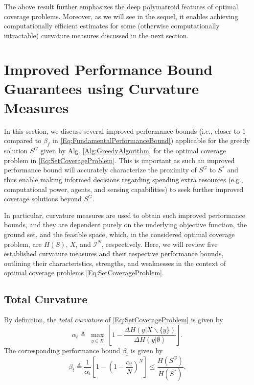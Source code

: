 \documentclass[letterpaper, 10 pt, conference]{ieeeconf}
\begin{document}


The above result further emphasizes the deep polymatroid features of optimal coverage problems. Moreover, as we will see in the sequel, it enables achieving computationally efficient estimates for some (otherwise computationally intractable) curvature measures discussed in the next section.


\section{Improved Performance Bound Guarantees using Curvature Measures}
\label{Sec:CurvatureMeasures}

In this section, we discuss several improved performance bounds (i.e., closer to $1$ compared to $\beta_f$ in \eqref{Eq:FundamentalPerformanceBound}) applicable for the greedy solution $S^G$ given by Alg. \ref{Alg:GreedyAlgorithm} for the optimal coverage problem in \eqref{Eq:SetCoverageProblem}.  
This is important as such an improved performance bound will accurately characterize the proximity of $S^G$ to $S^*$ and thus enable making informed decisions regarding spending extra resources (e.g., computational power, agents, and sensing capabilities) to seek further improved coverage solutions beyond $S^G$. 


In particular, curvature measures are used to obtain such improved performance bounds, and they are dependent purely on the underlying objective function, the ground set, and the feasible space, which, in the considered optimal coverage problem, are $H(S)$, $X$, and $\mathcal{I}^N$, respectively. Here, we will review five established curvature measures and their respective performance bounds, outlining their characteristics, strengths, and weaknesses in the context of optimal coverage problems \eqref{Eq:SetCoverageProblem}. 


\subsection{Total Curvature \cite{Conforti1984}}
\label{SubSec:TotalCurvature}



By definition, the \emph{total curvature} of \eqref{Eq:SetCoverageProblem} is given by  
\begin{equation}\label{Eq:TotalCurvatureCoefficientTheory}
    \alpha_t \triangleq \max_{\substack{y \in X} }\left[1 - \frac{\Delta H(y \vert X \backslash \{y\})}{\Delta H(y \vert \emptyset)}\right].
\end{equation}
The corresponding performance bound $\beta_t$ is given by
\begin{equation}\label{Eq:TotalCurvatureBoundTheory}
    \beta_t \triangleq \frac{1}{\alpha_t} \left[ 1 - \left( 1 -\frac{\alpha_t}{N} \right)^N \right] \leq \frac{H(S^G)}{H(S^*)}.
\end{equation}
\end{document}
